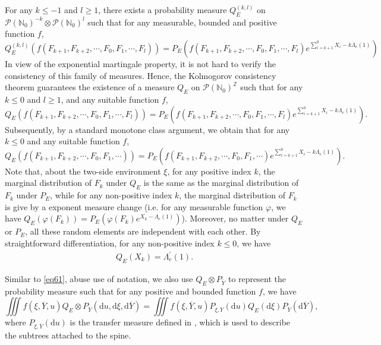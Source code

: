 \documentclass[]{article}
\numberwithin{equation}{section}
\theoremstyle{thmstyleone}%
\theoremstyle{thmstyletwo}%
\theoremstyle{thmstylethree}%
\theoremstyle{thmstylefour}%
\theoremstyle{thmstylefive}%
\theoremstyle{thmstylesix}%
\renewcommand{\d}{\mathrm{d}}
\newcommand{\N}{\mathbb{N}}
\begin{document}
	
	For any $k\leqslant -1$ and $l\geqslant 1$, there exists a probability measure $Q_E^{(k,l)}$ on $ \mathcal{P}\left(\N_0\right)^{-k} \otimes \mathcal{P}\left(\N_0\right)^l $ such that for any measurable, bounded and positive function $f$, 
	\begin{equation*}
		Q_E^{(k,l)} (f(F_{k+1},F_{k+2},\cdots,F_0, F_1,\cdots,F_{l}))
		=
		P_E \left(
		f(F_{k+1},F_{k+2},\cdots,F_0, F_1,\cdots,F_{l})
		e^{\sum\limits_{i=k+1}^{0} X_i-k\Lambda_e(1)}
		\right)
	\end{equation*}
	In view of the exponential martingale property, it is not hard to verify the consistency of this family of measures. Hence, the Kolmogorov consistency theorem guarantees the existence of a measure $Q_E$ on $\mathcal{P}\left(\N_0\right)^{\mathbb{Z}}$ such that for any $k\leqslant0$ and $l\geqslant 1$, and any suitable function $f$,
	\begin{equation*}
		Q_E\left(
		f(F_{k+1},F_{k+2},\cdots,F_0,F_1,\cdots,F_l)
		\right) = P_E\left(
		f(F_{k+1},F_{k+2},\cdots,F_0,F_1,\cdots,F_l) e^{\sum\limits_{i=k+1}^{0} X_i-k\Lambda_e(1)}
		\right).
	\end{equation*}
	Subsequently, by a standard monotone class argument, we obtain that for any $k\leqslant 0$ and any suitable function $f$, 
	\begin{equation*}
		Q_E\left(
		f(F_{k+1},F_{k+2},\cdots,F_0,F_1,\cdots)
		\right) = P_E\left(
		f(F_{k+1},F_{k+2},\cdots,F_0,F_1,\cdots) e^{\sum\limits_{i=k+1}^{0} X_i-k\Lambda_e(1)}
		\right).
	\end{equation*}
	Note that, about the two-side environment $\xi$, for any positive index $k$, the marginal distribution of $F_k$ under $Q_E$ is the same as the marginal distribution of $F_k$ under $P_E$, while for any non-positive index $k$, the marginal distribution of $F_k$ is give by a exponent measure change (i.e. for any measurable function $\varphi$, we have $Q_E(\varphi(F_k)) = P_E\left( \varphi(F_k) e^{X_k-\Lambda_e(1)} \right)$). Moreover, no matter under $Q_E$ or $P_E$, all these random elements are independent with each other.
	By straightforward differentiation, for any non-positive index $k\leqslant 0$, we have
	\begin{align}\label{79}
		Q_E\left(X_{k}\right) = \Lambda_e^{\prime}(1).
	\end{align}
	
	Similar to \cref{eq61}, abuse use of notation, we also use $Q_E\otimes P_{\overline{Y}}$ to represent the probability measure such that for any positive and bounded function $f$, we have
	\begin{equation}\label{eq84}
		\iiint f(\xi,\overline{Y},u) Q_E\otimes P_{\overline{Y}}(\d u,\d \xi,\d \overline{Y})
		=
		\iiint f(\xi,\overline{Y},u) P_{\xi,\overline{Y}}(\d u) Q_E(\d \xi) P_{\overline{Y}} (\d \overline{Y}),
	\end{equation}
	where $ P_{\xi,\overline{Y}}(\d u) $ is the transfer measure defined in , which is used to describe the subtrees attached to the spine.
	
\end{document}
